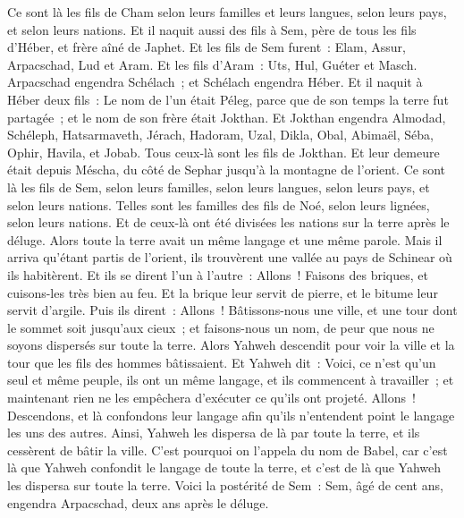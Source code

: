 \begin{multicols}{2}
Ce sont là les fils de Cham selon leurs familles et leurs langues, selon leurs pays, et selon leurs nations.
Et il naquit aussi des fils à Sem, père de tous les fils d'Héber, et frère aîné de Japhet.
Et les fils de Sem furent~: Elam, Assur, Arpacschad, Lud et Aram.
Et les fils d'Aram~: Uts, Hul, Guéter et Masch.
Arpacschad engendra Schélach~; et Schélach engendra Héber.
Et il naquit à Héber deux fils~: Le nom de l'un était Péleg, parce que de son temps la terre fut partagée~; et le nom de son frère était Jokthan.
Et Jokthan engendra Almodad, Schéleph, Hatsarmaveth, Jérach,
Hadoram, Uzal, Dikla,
Obal, Abimaël, Séba,
Ophir, Havila, et Jobab. Tous ceux-là sont les fils de Jokthan.
Et leur demeure était depuis Méscha, du côté de Sephar jusqu'à la montagne de l'orient.
Ce sont là les fils de Sem, selon leurs familles, selon leurs langues, selon leurs pays, et selon leurs nations.
Telles sont les familles des fils de Noé, selon leurs lignées, selon leurs nations. Et de ceux-là ont été divisées les nations sur la terre après le déluge.
\VerseOne{}Alors toute la terre avait un même langage et une même parole.
Mais il arriva qu'étant partis de l'orient, ils trouvèrent une vallée au pays de Schinear où ils habitèrent.
Et ils se dirent l'un à l'autre~: Allons~! Faisons des briques, et cuisons-les très bien au feu. Et la brique leur servit de pierre, et le bitume leur servit d'argile.
Puis ils dirent~: Allons~! Bâtissons-nous une ville, et une tour dont le sommet soit jusqu'aux cieux~; et faisons-nous un nom, de peur que nous ne soyons dispersés sur toute la terre.
Alors Yahweh descendit pour voir la ville et la tour que les fils des hommes bâtissaient.
Et Yahweh dit~: Voici, ce n'est qu'un seul et même peuple, ils ont un même langage, et ils commencent à travailler~; et maintenant rien ne les empêchera d'exécuter ce qu'ils ont projeté.
Allons~! Descendons, et là confondons leur langage afin qu'ils n'entendent point le langage les uns des autres.
Ainsi, Yahweh les dispersa de là par toute la terre, et ils cessèrent de bâtir la ville.
C'est pourquoi on l'appela du nom de Babel, car c'est là que Yahweh confondit le langage de toute la terre, et c'est de là que Yahweh les dispersa sur toute la terre.
Voici la postérité de Sem~: Sem, âgé de cent ans, engendra Arpacschad, deux ans après le déluge.

\end{multicols}
